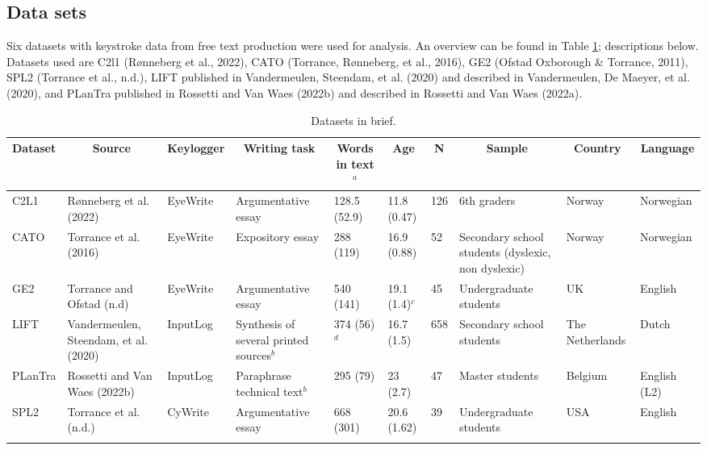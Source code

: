 \documentclass[
  man,floatsintext]{apa7}
\begin{document}
\hypertarget{data-sets}{%
\subsection{Data sets}\label{data-sets}}

Six datasets with keystroke data from free text production were used for analysis. An overview can be found in Table \ref{tab:datasets}; descriptions below. Datasets used are C2l1 (Rønneberg et al., 2022), CATO (Torrance, Rønneberg, et al., 2016), GE2 (Ofstad Oxborough \& Torrance, 2011), SPL2 (Torrance et al., n.d.), LIFT published in Vandermeulen, Steendam, et al. (2020) and described in Vandermeulen, De Maeyer, et al. (2020), and PLanTra published in Rossetti and Van Waes (2022b) and described in Rossetti and Van Waes (2022a).

\begin{landscape}

\begin{table}[tbp]

\begin{center}
\begin{threeparttable}

\caption{\label{tab:datasets}Datasets in brief.}

\footnotesize{

\begin{tabular}{p{1.5cm}p{2.75cm}p{1.75cm}p{2.25cm}p{1.75cm}p{1.75cm}p{.5cm}p{2.5cm}p{1.75cm}p{2cm}}
\toprule
Dataset & \multicolumn{1}{c}{Source} & \multicolumn{1}{c}{Keylogger} & \multicolumn{1}{c}{Writing task} & \multicolumn{1}{c}{Words in text$^a$} & \multicolumn{1}{c}{Age} & \multicolumn{1}{c}{N} & \multicolumn{1}{c}{Sample} & \multicolumn{1}{c}{Country} & \multicolumn{1}{c}{Language}\\
\midrule
C2L1 & Rønneberg et al. (2022) & EyeWrite & Argumentative essay & 128.5 (52.9) & 11.8 (0.47) & 126 & 6th graders & Norway & Norwegian\\
CATO & Torrance et al. (2016) & EyeWrite & Expository essay & 288 (119) & 16.9 (0.88) & 52 & Secondary school students (dyslexic, non dyslexic) & Norway & Norwegian\\
GE2 & Torrance and Ofstad (n.d) & EyeWrite & Argumentative essay & 540 (141) & 19.1 (1.4)$^c$ & 45 & Undergraduate students & UK & English\\
LIFT & Vandermeulen, Steendam, et al. (2020) & InputLog & Synthesis of several printed sources$^b$ & 374 (56)$^d$ & 16.7 (1.5) & 658 & Secondary school students & The Netherlands & Dutch\\
PLanTra & Rossetti and Van Waes (2022b) & InputLog & Paraphrase technical text$^b$ & 295 (79) & 23 (2.7) & 47 & Master students & Belgium & English (L2)\\
SPL2 & Torrance et al. (n.d.) & CyWrite & Argumentative essay & 668 (301) & 20.6 (1.62) & 39 & Undergraduate students & USA & English\\
\bottomrule
\addlinespace
\end{tabular}

}
\end{threeparttable}
\end{center}
\end{table}
\end{landscape}
\end{document}
